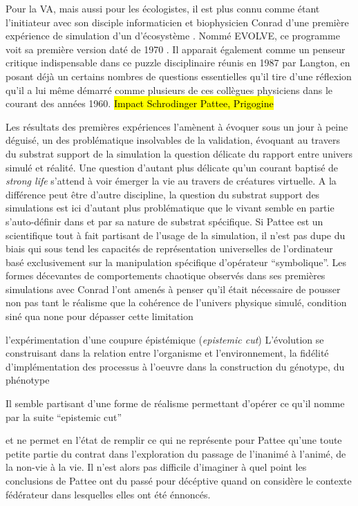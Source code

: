 Pour la VA, mais aussi pour les écologistes, il est plus connu comme étant l'initiateur avec son disciple informaticien et biophysicien Conrad d'une première expérience de simulation d'un d'écosystème . Nommé EVOLVE, ce programme  voit sa première version daté de 1970 \autocites{Conrad1970, Pattee2002}. Il apparait également comme un penseur critique indispensable dans ce puzzle disciplinaire réunis en 1987 par Langton, en posant déjà un certains nombres de questions essentielles qu'il tire d'une réflexion qu'il a lui même démarré comme plusieurs de ces collègues physiciens dans le courant des années 1960. \hl{Impact Schrodinger Pattee, Prigogine} \autocite{Pattee1988}



Les résultats des premières expériences l'amènent à évoquer sous un jour à peine déguisé, un des problématique insolvables de la validation, évoquant au travers du substrat support de la simulation la question délicate du rapport entre univers simulé et réalité. Une question d'autant plus délicate qu'un courant baptisé de \textit{strong life} s'attend à voir émerger la vie au travers de créatures virtuelle. A la différence peut être d'autre discipline,  la question du substrat support des simulations est ici d'autant plus problématique que le vivant semble en partie s'auto-définir dans et par sa nature de substrat spécifique. Si Pattee est un scientifique tout à fait partisant de l'usage de la simulation, il n'est pas dupe du biais qui sous tend les capacités de représentation universelles de l'ordinateur basé exclusivement sur la manipulation spécifique d'opérateur \enquote{symbolique}. Les formes décevantes de comportements chaotique observés dans ses premières simulations avec Conrad l'ont amenés à penser qu'il était nécessaire de pousser non pas tant le réalisme que la cohérence de l'univers physique simulé, condition siné qua none pour dépasser cette limitation

 l'expérimentation d'une coupure épistémique (\textit{epistemic cut}) L'évolution se construisant dans la relation entre l'organisme et l'environnement, la fidélité d'implémentation des processus à l'oeuvre dans la construction du génotype, du phénotype 

Il semble partisant d'une forme de réalisme permettant d'opérer ce qu'il nomme par la suite \enquote{epistemic cut}

et ne permet en l'état de remplir ce qui ne représente pour Pattee qu'une toute petite partie du contrat dans l'exploration du passage de l'inanimé à l'animé, de la non-vie à la vie. Il n'est alors pas difficile d'imaginer à quel point les conclusions de Pattee ont du passé pour décéptive quand on considère le contexte fédérateur dans lesquelles elles ont été énnoncés.

